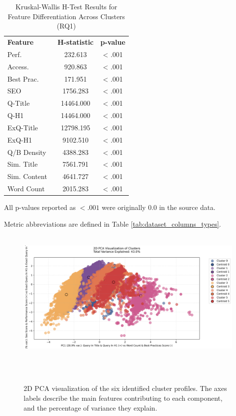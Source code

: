 \documentclass[a4paper,fleqn]{cas-sc}
\newcommand{\sbf}[1]{\scriptsize\textbf{#1}}
\newcommand{\dmidrule}{\specialrule{0.8pt}{0pt}{0.4pt}\specialrule{0.8pt}{0pt}{0pt}}
\begin{document}
\begin{table}[htbp!]
\centering
\caption{Kruskal-Wallis H-Test Results for Feature Differentiation Across Clusters (RQ1)}
\label{app:rq1_cluster_validation_table}
\small
\setlength{\tabcolsep}{3pt}
\renewcommand{\arraystretch}{1}
\begin{threeparttable}
\begin{tabular*}{\textwidth}{l@{\extracolsep{\fill}} S[table-format=5.3] S[table-format=1.3,table-comparator=true]}
\toprule
\sbf{Feature} & {\sbf{H-statistic}} & {\sbf{p-value}} \\
\dmidrule
Perf.  & 232.613 & < .001 \\
Access.  & 920.863 & < .001 \\
Best Prac.  & 171.951 & < .001 \\
SEO  & 1756.283 & < .001 \\
Q-Title  & 14464.000 & < .001 \\
Q-H1  & 14464.000 & < .001 \\
ExQ-Title  & 12798.195 & < .001 \\
ExQ-H1  & 9102.510 & < .001 \\
Q/B Density  & 4388.283 & < .001 \\
Sim. Title  & 7561.791 & < .001 \\
Sim. Content  & 4641.727 & < .001 \\
Word Count  & 2015.283 & < .001 \\
\bottomrule
\end{tabular*}
\begin{tablenotes}[flushleft]
\scriptsize
\item All p-values reported as $< .001$ were originally $0.0$ in the source data.
\item Metric abbreviations are defined in Table \ref{tab:dataset_columns_types}.
\end{tablenotes}
\end{threeparttable}
\end{table}


\begin{figure}[htbp!]
 \centering
    \includegraphics[width=\columnwidth]{figs/rq1_cluster_pca_2d.png}
    \caption{2D PCA visualization of the six identified cluster profiles. The axes labels describe the main features contributing to each component, and the percentage of variance they explain.}
    \label{fig:pca_visualization}
\end{figure}
\end{document}
